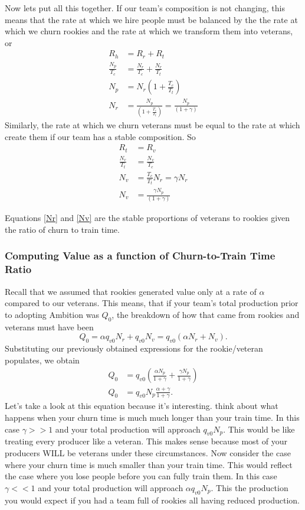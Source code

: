 \documentclass[paper=a4, fontsize=11pt abstract]{scrartcl}
\numberwithin{equation}{section}		%
\numberwithin{figure}{section}			%
\numberwithin{table}{section}				%
\begin{document}
Now lets put all this together.  If our team's composition is not changing, this means that the rate at which we hire people must be balanced by the the rate at which we churn rookies and the rate at which we transform them into veterans, or
\begin{align}
    R_h &= R_r + R_t \\
    \frac{N_p}{T_c} &= \frac{N_r}{T_c} + \frac{N_r}{T_t} \\
    N_p &= N_r\left(1 + \frac{T_c}{T_t}\right) \\
    N_r &= \frac{N_p}{\left(1 + \frac{T_c}{T_t}\right)} = \frac{N_p}{\left(1 + \gamma\right)} \label{Nr}
\end{align}
Similarly, the rate at which we churn veterans must be equal to the rate at which create them if our team has a stable composition.  So
\begin{align}
    R_t &= R_v \\
    \frac{N_r}{T_t} &= \frac{N_v}{T_c} \\
    N_v &= \frac{T_c}{T_t}N_r = \gamma N_r \\
    N_v &= \frac{\gamma N_p}{\left(1 + \gamma\right)} \label{Nv}
\end{align}

Equations \ref{Nr} and \ref{Nv} are the stable proportions of veterans to rookies given the ratio of churn to train time.

\subsubsection{Computing Value as a function of Churn-to-Train Time Ratio}
Recall that we assumed that rookies generated value only at a rate of $\alpha$ compared to our veterans.  This means, that if your team's total production prior to adopting Ambition was $Q_0$, the breakdown of how that came from rookies and veterans must have been
\begin{equation}
    Q_0 = \alpha q_{v0} N_r + q_{v0} N_v = q_{v0}\left(\alpha N_r + N_v\right).
\end{equation}
Substituting our previously obtained expressions for the rookie/veteran populates, we obtain
\begin{align}
    Q_0 &= q_{v0}\left(\frac{\alpha N_p}{1 + \gamma} + \frac{\gamma N_p}{1 + \gamma}\right)  \\
    Q_0 &= q_{v0} N_p\frac{\alpha + \gamma}{1 + \gamma} \label{Q0}.
\end{align}
Let's take a look at this equation because it's interesting.  think about what happens when your churn time is much much longer than your train time.  In this case $\gamma >> 1$ and your total production will approach $q_{v0}N_p$. This would be like treating every producer like a veteran.  This makes sense because most of your producers WILL be veterans under these circumstances.  Now consider the case where your churn time is much smaller than your train time.  This would reflect the case where you lose people before you can fully train them.  In this case $\gamma << 1$ and your total production will approach $\alpha q_{v0} N_p$.  This the production you would expect if you had a team full of rookies all having reduced production.
\end{document}
